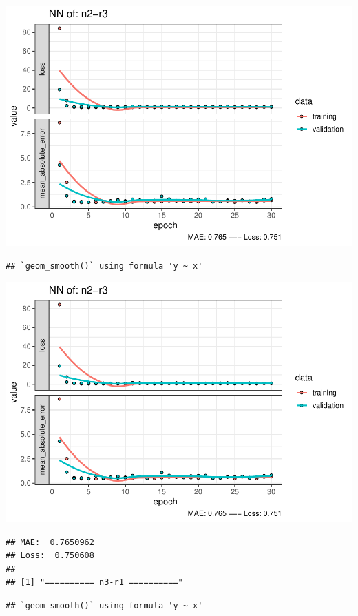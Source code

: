 \documentclass[
]{article}
\begin{document}
\includegraphics{project-code_files/figure-latex/unnamed-chunk-18-21.pdf}

\begin{verbatim}
## `geom_smooth()` using formula 'y ~ x'
\end{verbatim}

\includegraphics{project-code_files/figure-latex/unnamed-chunk-18-22.pdf}

\begin{verbatim}
## MAE:  0.7650962
## Loss:  0.750608 
## 
## [1] "========== n3-r1 =========="
\end{verbatim}

\begin{verbatim}
## `geom_smooth()` using formula 'y ~ x'
\end{verbatim}
\end{document}
